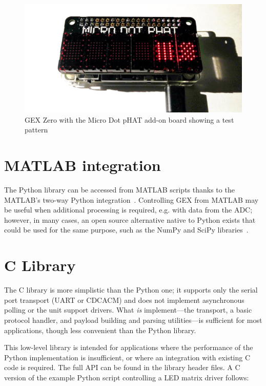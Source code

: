 \begin{figure}[h]
	\centering
	\includegraphics[width=.7\textwidth] {img/phatmtx.jpg}
	\caption{\label{fig:pydemo}GEX Zero with the Micro Dot pHAT add-on board showing a test pattern}
\end{figure}

\section{MATLAB integration}

The Python library can be accessed from MATLAB scripts thanks to the MATLAB's two-way Python integration~\cite{matlabpy}. Controlling GEX from MATLAB may be useful when additional processing is required, e.g. with data from the \gls{ADC}; however, in many cases, an open source alternative native to Python exists that could be used for the same purpose, such as the NumPy and SciPy libraries~\cite{numpyscipy}.


\section{C Library}

The C library is more simplistic than the Python one; it supports only the serial port transport (\gls{UART} or \gls{CDCACM}) and does not implement asynchronous polling or the unit support drivers. What \textit{is} implement---the transport, a basic protocol handler, and payload building and parsing utilities---is sufficient for most applications, though less convenient than the Python library.

This low-level library is intended for applications where the performance of the Python implementation is insufficient, or where an integration with existing C code is required. The full \gls{API} can be found in the library header files. A C version of the example Python script controlling a \gls{LED} matrix driver follows:








